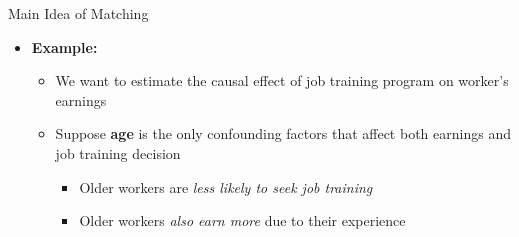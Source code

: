 \documentclass[dvipsnames,hyperref={pdfpagelabels=false}]{beamer}
\begin{document}
\begin{frame}{Main Idea of Matching}
	\begin{itemize}
		
		\item \textbf{Example:} 
				\vspace{0.2cm}
			\begin{itemize}
		\item We want to estimate the causal effect of job training program on worker's earnings
		\vspace{0.2cm}

		\item Suppose \textbf{age} is the only confounding factors that affect both earnings and job training decision
		\vspace{0.2cm}
\begin{itemize}
    \item Older workers are \emph{less likely to seek job training}
    \vspace{0.15cm}
    \item Older workers \emph{also earn more} due to their experience
\end{itemize}
					\end{itemize}
	\end{itemize}
\end{frame}
\end{document}
